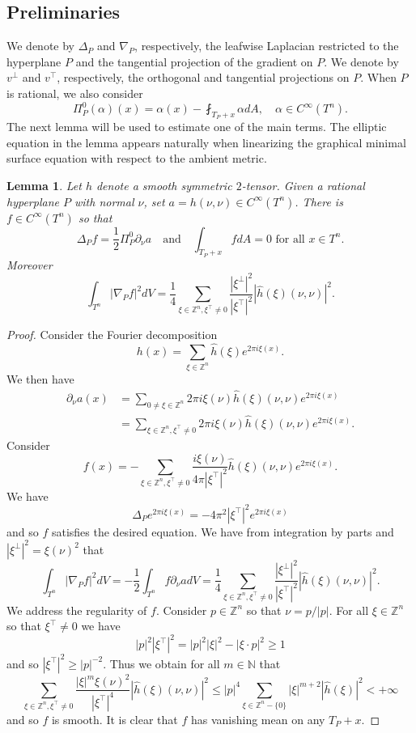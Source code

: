 \documentclass[11pt]{amsart}
\def\N{\mathbb N}
\def\Z{\mathbb Z}
\newtheorem{lemm}[thm]{Lemma}
\theoremstyle{remark}
\theoremstyle{definition}
\begin{document}
	\subsection{Preliminaries}
	We denote by $\Delta_P$ and $\nabla_P$, respectively, the leafwise Laplacian restricted to the hyperplane $P$ and the tangential projection of the gradient on $P$. We denote by $v^{\bot}$ and $v^{\top}$, respectively, the orthogonal and tangential projections on $P$. When $P$ is rational, we also consider
	$$\Pi^0_P(\alpha)(x)=\alpha(x)-\fint_{T_P+x}\alpha dA, \quad\alpha\in C^{\infty}(T^n).$$
	The next lemma will be used to estimate one of the main terms. The elliptic equation in the lemma appears naturally when linearizing the graphical minimal surface equation with respect to the ambient metric.
	\begin{lemm}\label{fourier.lemma}
		Let $h$ denote a smooth { symmetric $2$-tensor}. Given a rational hyperplane $P$ with normal $\nu$, set $a=h(\nu,\nu)\in C^{\infty}(T^n)$. There is $f\in C^\infty(T^n)$ so that
		$$\Delta_P f=\frac12\Pi_P^0\partial_\nu a\quad\text{and}\quad \int_{T_P+x}fdA=0\text{ for all }x\in T^n.$$
		Moreover
		$$\int_{T^n}|\nabla_P f|^2dV=\frac14\sum_{\xi \in \Z^n,\xi^{\top}\neq0} \frac{|\xi^{\bot}|^2}{|\xi^{\top}|^2}|\widehat h(\xi)(\nu,\nu)|^2.
		$$
	\end{lemm}
	\begin{proof} 
		Consider the Fourier decomposition
		$$
		h(x)=\sum_{\xi\in \Z^n}\widehat h(\xi)e^{2\pi i\xi(x)}.
		$$
		We then have
		\begin{align*}\partial_\nu a(x)&=\sum_{0\neq \xi\in \Z^n}2\pi i \xi(\nu) \widehat h(\xi)(\nu,\nu)e^{2\pi i\xi(x)}\\
			&{=\sum_{ \xi\in \Z^n,\xi^{\top}\neq 0}2\pi i \xi(\nu) \widehat h(\xi)(\nu,\nu)e^{2\pi i\xi(x)}}.
		\end{align*}
		Consider 
		$$f(x)=-\sum_{ \xi\in \Z^n,\xi^{\top}\neq 0}\frac{ i\xi(\nu)}{4\pi|\xi^{\top}|^2}\widehat h(\xi)(\nu,\nu)e^{2\pi i\xi(x)}.$$
		We have 
		$$\Delta_Pe^{2\pi i\xi(x)}=-4\pi^2|\xi^{\top}|^2e^{2\pi i\xi(x)}$$
		and so $f$ satisfies the desired equation.  We have from integration by parts and  {$|\xi^{\bot}|^2=\xi(\nu)^2$}  that
		$$\int_{T^n}|\nabla_P f|^2dV=-\frac12\int_{T^n}f\partial_\nu adV=\frac14\sum_{\xi \in \Z^n,\xi^{\top}\neq0} \frac{|\xi^{\bot}|^2}{|\xi^{\top}|^2}|\widehat h(\xi)(\nu,\nu)|^2.
		$$
		We address the regularity of $f$. {Consider $p\in\Z^n$ so that $\nu=p/|p|$. For all $\xi\in \Z^n$ so that $\xi^{\top}\neq0$ we have
			$$|p|^2|\xi^{\top}|^2=|p|^2|\xi|^2-|\xi\cdot p|^2\geq 1$$
			and so $|\xi^{\top}|^2	\geq |p|^{-2}$.}
		Thus we obtain for all $m\in\N$ that
		$$
		\sum_{ \xi\in \Z^n,\xi^{\top}\neq 0}\frac{ |\xi|^m{\xi(\nu)^2}}{|\xi^{\top}|^4}|\widehat h(\xi)(\nu,\nu)|^2{\leq|p|^4{\sum_{ \xi\in \Z^n-\{0\}} |\xi|^{m+2}|\widehat h(\xi)|^2}} <+\infty
		$$
		and so $f$ is smooth. It is clear that $f$ has vanishing mean on any $T_P+x$. 
	\end{proof}
	
\end{document}
